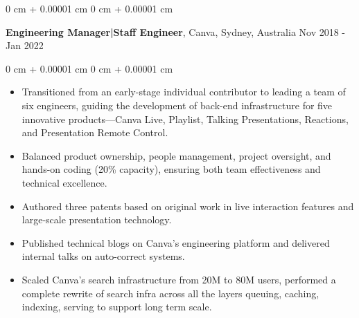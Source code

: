 \documentclass[10pt, letterpaper]{article}
\newenvironment{highlights}{
    \begin{itemize}[
        topsep=0.20 cm,     %
        parsep=0.20 cm,     %
        partopsep=0pt,
        itemsep=0.15cm,     %
        leftmargin=0 cm + 10pt
    ]
}{
    \end{itemize}
} %
\newenvironment{onecolentry}{
    \begin{adjustwidth}{
        0 cm + 0.00001 cm
    }{
        0 cm + 0.00001 cm
    }
}{
    \end{adjustwidth}
} %
\newenvironment{twocolentry}[2][]{
    \onecolentry
    \def\secondColumn{#2}
    \setcolumnwidth{\fill, 4.5 cm}
    \begin{paracol}{2}
}{
    \switchcolumn \raggedleft \secondColumn
    \end{paracol}
    \endonecolentry
} %
\begin{document}
        \vspace{0.35 cm} %

        \begin{twocolentry}{
            Nov 2018 - Jan 2022
        }
            \textbf{Engineering Manager|Staff Engineer}, Canva, Sydney, Australia\end{twocolentry}

        \vspace{0.20 cm} %
        \begin{onecolentry}
            \begin{highlights}
                \item Transitioned from an early-stage individual contributor to leading a team of six engineers, guiding the development of back-end infrastructure for five innovative products—Canva Live, Playlist, Talking Presentations, Reactions, and Presentation Remote Control.
                \item Balanced product ownership, people management, project oversight, and hands-on coding (20\% capacity), ensuring both team effectiveness and technical excellence.
                \item Authored three patents based on original work in live interaction features and large-scale presentation technology.
                \item Published technical blogs on Canva's engineering platform and delivered internal talks on auto-correct systems.
                \item Scaled Canva's search infrastructure from 20M to 80M users, performed a complete rewrite of search infra across all the layers queuing, caching, indexing, serving to support long term scale.
            \end{highlights}
        \end{onecolentry}
\end{document}
